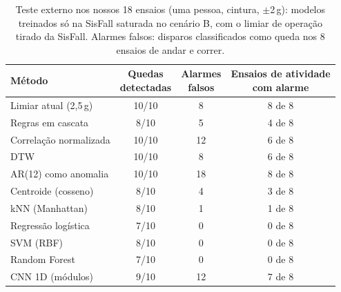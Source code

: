 \begin{table}[H]
\centering
\caption{Teste externo nos nossos 18 ensaios (uma pessoa, cintura, $\pm$2\,g): modelos treinados só na SisFall saturada no cenário B, com o limiar de operação tirado da SisFall. Alarmes falsos: disparos classificados como queda nos 8 ensaios de andar e correr.}
\label{tab:proprios}
\small
\setlength{\tabcolsep}{4pt}
\begin{tabular}{@{}lccc@{}}
\toprule
Método & \makecell{Quedas\\detectadas} & \makecell{Alarmes\\falsos} & \makecell{Ensaios de atividade\\com alarme} \\
\midrule
Limiar atual (2,5\,g) & 10/10 & 8 & 8 de 8 \\
Regras em cascata & 8/10 & 5 & 4 de 8 \\
Correlação normalizada & 10/10 & 12 & 6 de 8 \\
DTW & 10/10 & 8 & 6 de 8 \\
AR(12) como anomalia & 10/10 & 18 & 8 de 8 \\
Centroide (cosseno) & 8/10 & 4 & 3 de 8 \\
kNN (Manhattan) & 8/10 & 1 & 1 de 8 \\
Regressão logística & 7/10 & 0 & 0 de 8 \\
SVM (RBF) & 8/10 & 0 & 0 de 8 \\
Random Forest & 7/10 & 0 & 0 de 8 \\
CNN 1D (módulos) & 9/10 & 12 & 7 de 8 \\
\bottomrule
\end{tabular}
\end{table}
